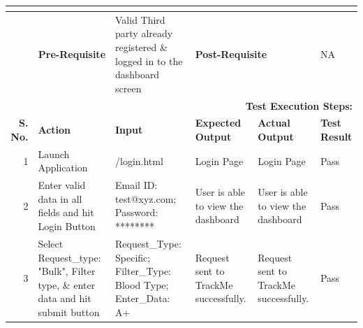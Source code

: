 \documentclass[a4paper, hidelinks, 12pt]{report}
\begin{document}
\begin{itemize}
\begin{table}[H]
\begin{tabular}{|r|p{4.355em}|p{7.715em}|p{6.43em}|p{5.855em}|p{5.07em}|}
    \multicolumn{2}{|l|}{} & \multicolumn{1}{l|}{} & \multicolumn{2}{l|}{} & \multicolumn{1}{l|}{} \\
    \midrule
    \multicolumn{2}{|p{13.425em}|}{\textbf{Pre-Requisite}} & Valid Third party already registered \& logged in to the dashboard screen & \multicolumn{2}{p{12.285em}|}{\textbf{Post-Requisite}} & NA \\
    \midrule
    \multicolumn{6}{p{38.495em}|}{\textbf{Test Execution Steps:}} \\
    \midrule
    \multicolumn{1}{|p{5.07em}|}{\textbf{S. No.}} & \textbf{Action } & \textbf{Input} & \textbf{Expected Output} & \textbf{Actual Output} & \textbf{Test Result} \\
    \midrule
    1     & Launch Application & /login.html & Login Page & Login Page & Pass \\
    \midrule
    2     & Enter valid data in all fields and hit Login Button & Email ID: test@xyz.com; Password: ******** & User is able to view the dashboard & User is able to view the dashboard & Pass \\
    \midrule
    3     & Select Request\_type: "Bulk", Filter type, \& enter data and hit submit button & Request\_Type: Specific; Filter\_Type: Blood Type; Enter\_Data: A+ & Request sent to TrackMe successfully. & Request sent to TrackMe successfully. & Pass \\
    \bottomrule
    \end{tabular}%
  \label{tab:Test Case:Manage Request-2A }%
\end{table}%


\end{itemize}
\end{document}
